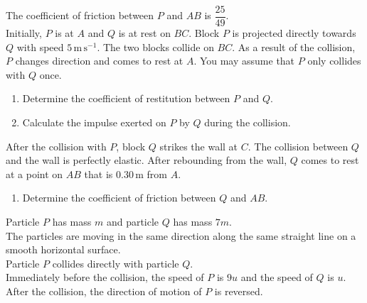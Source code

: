 \documentclass[leqno]{article}
\begin{document}
\begin{enumerate}[
  label=\textbf{\arabic*.},
  leftmargin=*,
  topsep=0pt,
  partopsep=0pt,
  parsep=0pt
]
The coefficient of friction between $P$ and $AB$ is $\dfrac{25}{49}$. \\

Initially, $P$ is at $A$ and $Q$ is at rest on $BC$. Block $P$ is projected directly towards $Q$ with speed $5\,\mathrm{m}\,\mathrm{s}^{-1}$. The two blocks collide on $BC$. As a result of the collision, $P$ changes direction and comes to rest at $A$. You may assume that $P$ only collides with $Q$ once. \\
\begin{enumerate}[label=\textbf{(\alph*)}]
  \item Determine the coefficient of restitution between $P$ and $Q$.  \\
  \item Calculate the impulse exerted on $P$ by $Q$ during the collision.  \\
\end{enumerate}
After the collision with $P$, block $Q$ strikes the wall at $C$. The collision between $Q$ and the wall is perfectly elastic. After rebounding from the wall, $Q$ comes to rest at a point on $AB$ that is $0.30\,\mathrm{m}$ from $A$. \\
\begin{enumerate}[label=\textbf{(\alph*)}, resume]
  \item Determine the coefficient of friction between $Q$ and $AB$.  \\
\end{enumerate}

\newpage

\questionitem

Particle $P$ has mass $m$ and particle $Q$ has mass $7m$. \\

The particles are moving in the same direction along the same straight line on a smooth horizontal surface. \\
Particle $P$ collides directly with particle $Q$. \\
Immediately before the collision, the speed of $P$ is $9u$ and the speed of $Q$ is $u$. \\
After the collision, the direction of motion of $P$ is reversed. \\


\end{enumerate}
\end{document}
